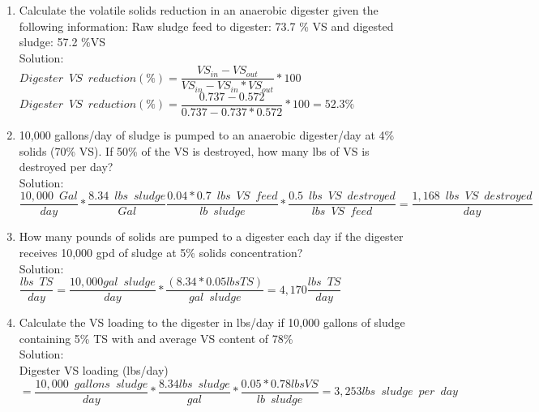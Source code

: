 \documentclass{article}
\begin{document}
\begin{enumerate}

\item Calculate the volatile solids reduction in an anaerobic digester given the following information: Raw sludge feed to digester: 73.7 \% VS and digested sludge: 57.2 \%VS\\

Solution:\\
\vspace{0.5cm}
$Digester \enspace VS \enspace reduction (\%)=\dfrac{VS_{in}-VS_{out}}{VS_{in}-VS_{in}*VS_{out}}*100$\\
\vspace{0.5cm}
$Digester \enspace VS \enspace reduction (\%)=\dfrac{0.737-0.572}{0.737-0.737*0.572}*100=\boxed{ 52.3\%}$\\

\item 10,000 gallons/day of sludge is pumped to an anaerobic digester/day at 4\% solids (70\% VS).  If 50\% of the VS is destroyed, how many lbs of VS is destroyed per day?\\
Solution:\\
$\dfrac{10,000 \enspace Gal}{day}*\dfrac{8.34 \enspace lbs \enspace sludge}{Gal} \dfrac{0.04*0.7 \enspace lbs \enspace VS \enspace feed}{lb \enspace sludge}*\dfrac{0.5 \enspace lbs \enspace VS \enspace destroyed}{lbs \enspace VS \enspace feed}=\boxed{\dfrac{1,168 \enspace lbs \enspace VS \enspace destroyed}{day} } $

\item How many pounds of solids are pumped to a digester each day if the digester receives 10,000 gpd of sludge at 5\% solids concentration?\\

Solution:\\

{
$
	\dfrac{lbs \enspace TS}{day}
	=
	\dfrac{10,000 gal \enspace sludge}{day}
	*
	\dfrac{(8.34*0.05 lbs TS )}{gal \enspace sludge}
	=4,170
	\dfrac{lbs \enspace TS}{day}
$
}\\

\item Calculate the VS loading to the digester in lbs/day if 10,000 gallons of sludge containing 5\% TS with and average VS content of 78\%\\
Solution:\\
Digester VS loading (lbs/day)\\$=\dfrac{10,000 \enspace gallons \enspace sludge}{day}*\dfrac{8.34lbs \enspace sludge}{gal}*\dfrac{0.05*0.78lbs VS}{lb \enspace sludge}=\boxed{3,253lbs \enspace sludge \enspace per \enspace day}$




\end{enumerate}
\end{document}
